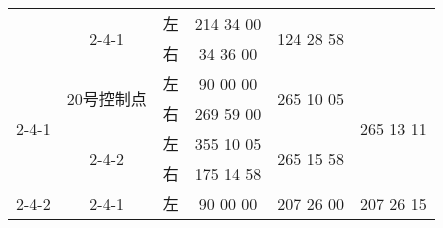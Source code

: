 \documentclass[UTF8]{ctexart}
\begin{document}
\begin{table}[h]
\begin{tabular}{|c|c|c|c|c|c|}
			& \multirow{2}{*}{2-4-1}  & 左                   & 214 34 00                                                                                                & \multirow{2}{*}{124 28 58}                                                                              &                                                                                                         \\ \cline{3-4}
			&                         & 右                   & 34 36 00                                                                                                 &                                                                                                         &                                                                                                         \\ \hline
			\multirow{4}{*}{2-4-1}  & \multirow{2}{*}{20号控制点} & 左                   & 90 00 00                                                                                                 & \multirow{2}{*}{265 10 05}                                                                              & \multirow{4}{*}{265 13 11}                                                                              \\ \cline{3-4}
			&                         & 右                   & 269 59 00                                                                                                &                                                                                                         &                                                                                                         \\ \cline{2-5}
			& \multirow{2}{*}{2-4-2}  & 左                   & 355 10 05                                                                                                & \multirow{2}{*}{265 15 58}                                                                              &                                                                                                         \\ \cline{3-4}
			&                         & 右                   & 175 14 58                                                                                                &                                                                                                         &                                                                                                         \\ \hline
			\multirow{4}{*}{2-4-2}  & \multirow{2}{*}{2-4-1}  & 左                   & 90 00 00                                                                                                 & \multirow{2}{*}{207 26 00}                                                                              & \multirow{4}{*}{207 26 15}                                                                              \\ \cline{3-4}

\end{tabular}
\end{table}
\end{document}
